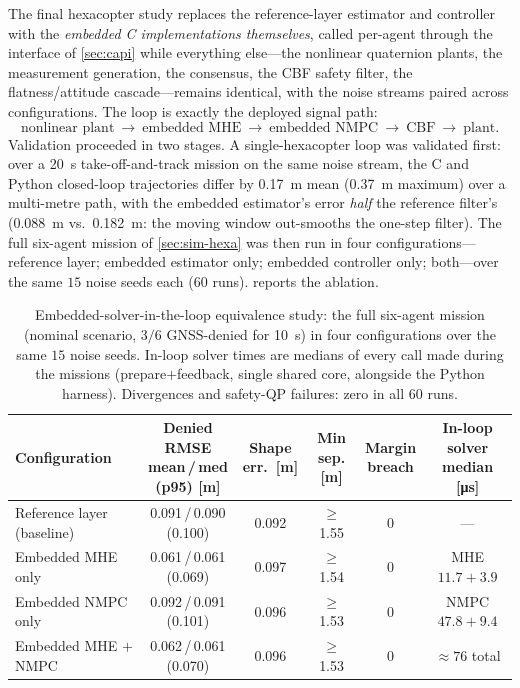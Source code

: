 The final hexacopter study replaces the reference-layer estimator and
controller with the \emph{embedded C implementations themselves}, called
per-agent through the interface of \cref{sec:capi} while everything else---the
nonlinear quaternion plants, the measurement generation, the consensus, the CBF
safety filter, the flatness/attitude cascade---remains identical, with the
noise streams paired across configurations. The loop is exactly the deployed
signal path:
\begin{equation*}
\text{nonlinear plant}\ \rightarrow\ \text{embedded MHE}\ \rightarrow\
\text{embedded NMPC}\ \rightarrow\ \text{CBF}\ \rightarrow\ \text{plant}.
\end{equation*}
Validation proceeded in two stages. A single-hexacopter loop was validated
first: over a \SI{20}{\second} take-off-and-track mission on the same noise
stream, the C and Python closed-loop trajectories differ by \SI{0.17}{\meter}
mean (\SI{0.37}{\meter} maximum) over a multi-metre path, with the embedded
estimator's error \emph{half} the reference filter's
(\SI{0.088}{\meter} vs.\ \SI{0.182}{\meter}: the moving window out-smooths the
one-step filter). The full six-agent mission of \cref{sec:sim-hexa} was then run
in four configurations---reference layer; embedded estimator only; embedded
controller only; both---over the same $15$ noise seeds each ($60$ runs).
\Cref{tab:inloop} reports the ablation.

\begin{table}[t]
\centering
\caption{Embedded-solver-in-the-loop equivalence study: the full six-agent
mission (nominal scenario, $3/6$ GNSS-denied for \SI{10}{\second}) in four
configurations over the same $15$ noise seeds. In-loop solver times are medians
of every call made during the missions (prepare${+}$feedback, single shared
core, alongside the Python harness). Divergences and safety-QP failures: zero
in all $60$ runs.}
\label{tab:inloop}
\small
\begin{tabular}{@{}lccccc@{}}
\toprule
Configuration & \shortstack{Denied RMSE\\mean\,/\,med (p95) [m]} &
\shortstack{Shape\\err.\ [m]} & \shortstack{Min sep.\\{[m]}} &
\shortstack{Margin\\breach} & \shortstack{In-loop solver\\median [\si{\micro\second}]}\\
\midrule
Reference layer (baseline) & 0.091\,/\,0.090 (0.100) & 0.092 & $\ge$1.55 & 0 & ---\\
Embedded MHE only & 0.061\,/\,0.061 (0.069) & 0.097 & $\ge$1.54 & 0 & MHE $11.7{+}3.9$\\
Embedded NMPC only & 0.092\,/\,0.091 (0.101) & 0.096 & $\ge$1.53 & 0 & NMPC $47.8{+}9.4$\\
Embedded MHE $+$ NMPC & 0.062\,/\,0.061 (0.070) & 0.096 & $\ge$1.53 & 0 & $\approx76$ total\\
\bottomrule
\end{tabular}
\end{table}

